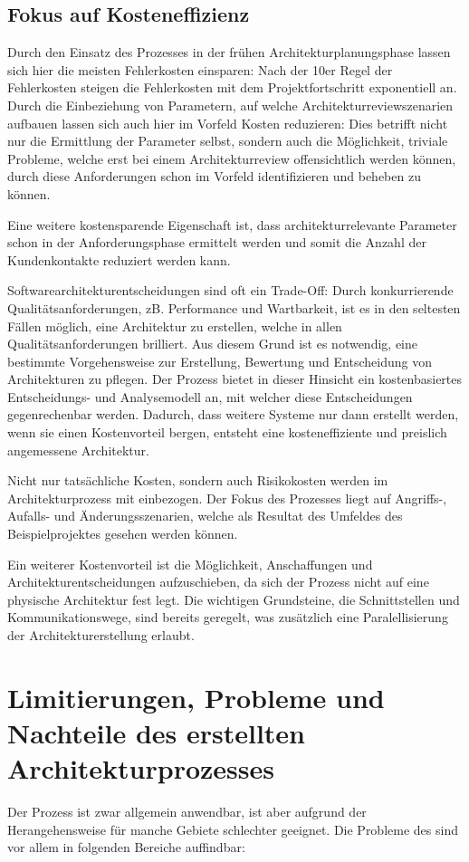 \subsection{Fokus auf Kosteneffizienz}
Durch den Einsatz des Prozesses in der frühen Architekturplanungsphase lassen sich hier die meisten Fehlerkosten einsparen: Nach der 10er Regel der Fehlerkosten steigen die Fehlerkosten mit dem Projektfortschritt exponentiell an. Durch die Einbeziehung von Parametern, auf welche  Architekturreviewszenarien aufbauen lassen sich auch hier im Vorfeld Kosten reduzieren: Dies betrifft nicht nur die Ermittlung der Parameter selbst, sondern auch die Möglichkeit, triviale Probleme, welche erst bei einem Architekturreview offensichtlich werden können, durch diese Anforderungen schon im Vorfeld identifizieren und beheben zu können.

Eine weitere kostensparende Eigenschaft ist, dass architekturrelevante Parameter schon in der Anforderungsphase ermittelt werden und somit die Anzahl der Kundenkontakte reduziert werden kann.

Softwarearchitekturentscheidungen sind oft ein Trade-Off: Durch konkurrierende Qualitätsanforderungen, zB. Performance und Wartbarkeit, ist es in den seltesten Fällen möglich, eine Architektur zu erstellen, welche in allen Qualitätsanforderungen brilliert. Aus diesem Grund ist es notwendig, eine bestimmte Vorgehensweise zur Erstellung, Bewertung und Entscheidung von Architekturen zu pflegen. Der Prozess bietet in dieser Hinsicht ein kostenbasiertes Entscheidungs- und Analysemodell an, mit welcher diese Entscheidungen gegenrechenbar werden. Dadurch, dass weitere Systeme nur dann erstellt werden, wenn sie einen Kostenvorteil bergen, entsteht eine kosteneffiziente und preislich angemessene Architektur.

Nicht nur tatsächliche Kosten, sondern auch Risikokosten werden im Architekturprozess mit einbezogen. Der Fokus des Prozesses liegt auf Angriffs-, Aufalls- und Änderungsszenarien, welche als Resultat des Umfeldes des Beispielprojektes gesehen werden können.

Ein weiterer Kostenvorteil ist die Möglichkeit, Anschaffungen und Architekturentscheidungen aufzuschieben, da sich der Prozess nicht auf eine physische Architektur fest legt. Die wichtigen Grundsteine, die Schnittstellen und Kommunikationswege, sind bereits geregelt, was zusätzlich eine Paralellisierung der Architekturerstellung erlaubt.


\section{Limitierungen, Probleme und Nachteile des erstellten Architekturprozesses}
Der Prozess ist zwar allgemein anwendbar, ist aber aufgrund der Herangehensweise für manche Gebiete schlechter geeignet. Die Probleme des sind vor allem in folgenden Bereiche auffindbar:

